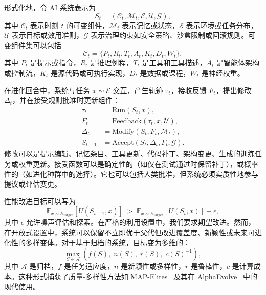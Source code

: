 形式化地，令 AI 系统表示为
\begin{equation}
S_t = (\mathcal{C}_t, \mathcal{M}_t, \mathcal{E}, \mathcal{U}, \mathcal{G}),
\end{equation}
其中 $\mathcal{C}_t$ 表示时刻 $t$ 的可变组件，$\mathcal{M}_t$ 表示记忆或状态，$\mathcal{E}$ 表示环境或任务分布，$\mathcal{U}$ 表示目标或效用准则，$\mathcal{G}$ 表示治理约束如安全策略、沙盒限制或回滚规则。可变组件集可以包括
\begin{equation}
\mathcal{C}_t = \{P_t, R_t, T_t, A_t, K_t, D_t, W_t\},
\end{equation}
其中 $P_t$ 是提示或指令，$R_t$ 是推理例程，$T_t$ 是工具和工具描述，$A_t$ 是智能体架构或控制流，$K_t$ 是源代码或可执行实现，$D_t$ 是数据或课程，$W_t$ 是神经权重。

在进化回合中，系统与任务 $x\sim\mathcal{E}$ 交互，产生轨迹 $\tau_t$，接收反馈 $F_t$，提出修改 $\Delta_t$，并在接受规则批准时更新组件：
\begin{align}
\tau_t &= \mathrm{Run}(S_t, x), \\
F_t &= \mathrm{Feedback}(\tau_t, x, \mathcal{U}), \\
\Delta_t &= \mathrm{Modify}(S_t, F_t, \mathcal{M}_t), \\
S_{t+1} &= \mathrm{Accept}(S_t, \Delta_t, F_t, \mathcal{G}).
\end{align}
修改可以是提示编辑、记忆条目、工具更新、代码补丁、架构变更、生成的训练任务或权重更新。接受函数可以是确定性的（如仅在测试通过时保留补丁），或概率性的（如进化种群中的选择）。它也可以包括人类批准，但系统必须实质性地参与提议或评估变更。

性能改进目标可以写为
\begin{equation}
\mathbb{E}_{x\sim\mathcal{E}_{\mathrm{target}}}\left[ U(S_{t+1},x) \right]
\;>\;
\mathbb{E}_{x\sim\mathcal{E}_{\mathrm{target}}}\left[ U(S_t,x) \right] - \epsilon,
\end{equation}
其中 $\epsilon$ 允许噪声评估和探索。在严格的利用设置中，我们要求期望改进。然而，在开放式设置中，系统可以保留不立即优于父代但改进覆盖度、新颖性或未来可进化性的多样变体。对于基于归档的系统，目标变为多维的：
\begin{equation}
\max_{S\in\mathcal{A}} \left( f(S),\; n(S),\; r(S),\; c(S)^{-1} \right),
\end{equation}
其中 $\mathcal{A}$ 是归档，$f$ 是任务适应度，$n$ 是新颖性或多样性，$r$ 是鲁棒性，$c$ 是计算成本。这种形式捕获了质量-多样性方法如 MAP-Elites~\citep{mouret2015illuminating} 及其在 AlphaEvolve~\citep{alphaevolve2025} 中的现代使用。

